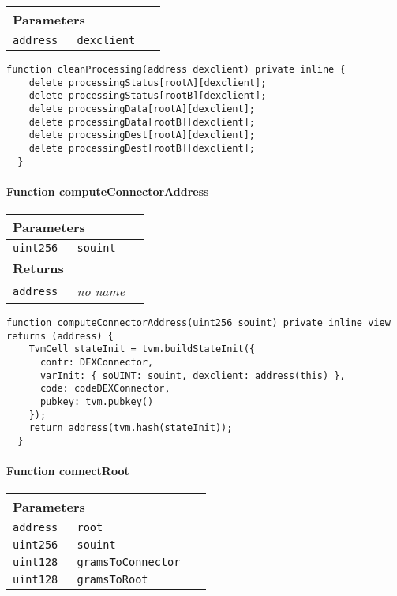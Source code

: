 \ifsoltables
\noindent\begin{tabular}{|l|l|p{5cm}|}\hline
\multicolumn{3}{|l|}{\bf Parameters}\\\hline
\tt address & \tt dexclient &\\\hline
\end{tabular}
\fi

\vspace{2cm}

\begin{lstlisting}[firstnumber=232]
  function cleanProcessing(address dexclient) private inline {
    delete processingStatus[rootA][dexclient];
    delete processingStatus[rootB][dexclient];
    delete processingData[rootA][dexclient];
    delete processingData[rootB][dexclient];
    delete processingDest[rootA][dexclient];
    delete processingDest[rootB][dexclient];
  }
\end{lstlisting}

\paragraph{Function computeConnectorAddress}


\ifsoltables
\noindent\begin{tabular}{|l|l|p{5cm}|}\hline
\multicolumn{3}{|l|}{\bf Parameters}\\\hline
\tt uint256 & \tt souint &\\\hline
\multicolumn{3}{|l|}{\bf Returns}\\\hline
\tt address & {\em no name} &\\\hline
\end{tabular}
\fi

\vspace{2cm}

\begin{lstlisting}[firstnumber=95]
  function computeConnectorAddress(uint256 souint) private inline view returns (address) {
    TvmCell stateInit = tvm.buildStateInit({
      contr: DEXConnector,
      varInit: { soUINT: souint, dexclient: address(this) },
      code: codeDEXConnector,
      pubkey: tvm.pubkey()
    });
    return address(tvm.hash(stateInit));
  }
\end{lstlisting}

\paragraph{Function connectRoot}


\ifsoltables
\noindent\begin{tabular}{|l|l|p{5cm}|}\hline
\multicolumn{3}{|l|}{\bf Parameters}\\\hline
\tt address & \tt root &\\\hline
\tt uint256 & \tt souint &\\\hline
\tt uint128 & \tt gramsToConnector &\\\hline
\tt uint128 & \tt gramsToRoot &\\\hline
\end{tabular}
\fi

